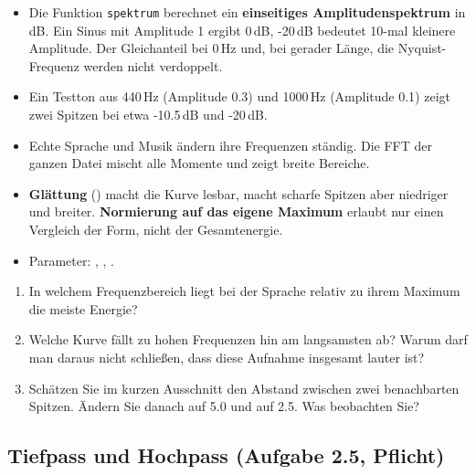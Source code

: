 \documentclass[11pt]{article}
\begin{document}

\begin{itemize}
  \item Die Funktion \texttt{spektrum} berechnet ein \textbf{einseitiges Amplitudenspektrum} in dB. Ein Sinus mit Amplitude 1 ergibt 0\,dB, -20\,dB bedeutet 10-mal kleinere Amplitude. Der Gleichanteil bei 0\,Hz und, bei gerader Länge, die Nyquist-Frequenz werden nicht verdoppelt.
  \item Ein Testton aus 440\,Hz (Amplitude 0.3) und 1000\,Hz (Amplitude 0.1) zeigt zwei Spitzen bei etwa -10.5\,dB und -20\,dB.
  \item Echte Sprache und Musik ändern ihre Frequenzen ständig. Die FFT der ganzen Datei mischt alle Momente und zeigt breite Bereiche.
  \item \textbf{Glättung} () macht die Kurve lesbar, macht scharfe Spitzen aber niedriger und breiter. \textbf{Normierung auf das eigene Maximum} erlaubt nur einen Vergleich der Form, nicht der Gesamtenergie.
  \item Parameter: , , .
\end{itemize}

\begin{block}
\begin{enumerate}
  \item In welchem Frequenzbereich liegt bei der Sprache relativ zu ihrem Maximum die meiste Energie?
  \item Welche Kurve fällt zu hohen Frequenzen hin am langsamsten ab? Warum darf man daraus nicht schließen, dass diese Aufnahme insgesamt lauter ist?
  \item Schätzen Sie im kurzen Ausschnitt den Abstand zwischen zwei benachbarten Spitzen. Ändern Sie danach  auf 5.0 und auf 2.5. Was beobachten Sie?
\end{enumerate}
\end{block}

\subsection[Tiefpass und Hochpass]{Tiefpass und Hochpass (Aufgabe 2.5, Pflicht)}

\end{document}
